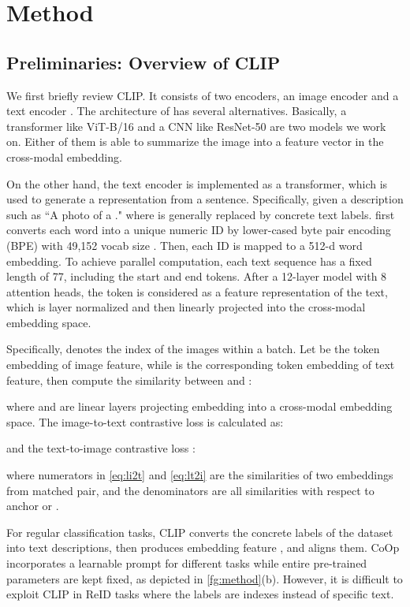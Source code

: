 \documentclass[letterpaper]{article} \usepackage{aaai23}  \usepackage{times}  \usepackage{helvet}  \usepackage{courier}  \usepackage[hyphens]{url}  \usepackage{graphicx} \urlstyle{rm} \def\UrlFont{\rm}  \usepackage{natbib}  \usepackage{caption} \frenchspacing  \setlength{\pdfpagewidth}{8.5in}  \setlength{\pdfpageheight}{11in}  \usepackage{algorithm}
\begin{document}
\section{Method}
\subsection{Preliminaries: Overview of CLIP}
We first briefly review CLIP. It consists of two encoders, an image encoder  and a text encoder . The architecture of  has several alternatives. Basically, a transformer like ViT-B/16 and a CNN like ResNet-50 are two models we work on. Either of them is able to summarize the image into a feature vector in the cross-modal embedding.

On the other hand, the text encoder  is implemented as a transformer, which is used to generate a representation from a sentence. Specifically, given a description such as ``A photo of a ." where  is generally replaced by concrete text labels.  first converts each word into a unique numeric ID by lower-cased byte pair encoding (BPE) with 49,152 vocab size \cite{BPE}. Then, each ID is mapped to a 512-d word embedding. To achieve parallel computation, each text sequence has a fixed length of 77, including the start  and end  tokens. After a 12-layer model with 8 attention heads, the  token is considered as a feature representation of the text, which is layer normalized and then linearly projected into the cross-modal embedding space.

Specifically,  denotes the index of the images within a batch. Let  be the  token embedding of image feature, while  is the corresponding  token embedding of text feature, then compute the similarity between  and :


where  and   are linear layers projecting embedding into a cross-modal embedding space. The image-to-text contrastive loss  is calculated as:

and the text-to-image contrastive loss :

where numerators in \cref{eq:li2t} and \cref{eq:lt2i} are the similarities of two embeddings from matched pair, and the denominators are all similarities with respect to anchor  or .

For regular classification tasks, CLIP converts the concrete labels of the dataset into text descriptions, then produces embedding feature  ,  and aligns them. CoOp incorporates a learnable prompt for different tasks while entire pre-trained parameters are kept fixed, as depicted in \cref{fg:method}(b). However, it is difficult to exploit CLIP in ReID tasks where the labels are indexes instead of specific text. 
\end{document}
